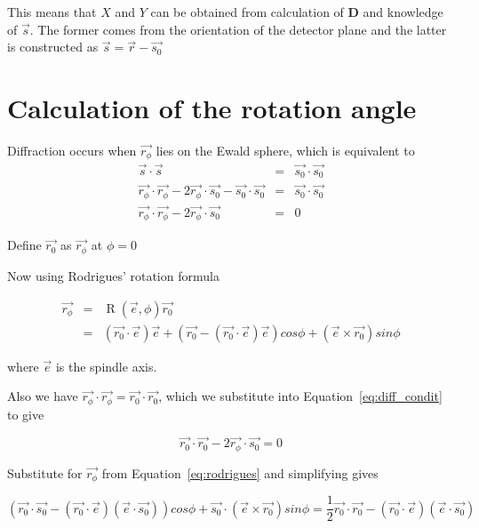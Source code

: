 \documentclass{article}
\begin{document}
This means that $X$ and $Y$ can be obtained from calculation of $\mathbf{D}$ and knowledge of $\vec{s}$. The former
comes from the orientation of the detector plane and the latter is constructed as $\vec{s} = \vec{r} - \vec{s_0}$


\section*{Calculation of the rotation angle}

Diffraction occurs when $\vec{r_\phi}$ lies on the Ewald sphere, which is equivalent to
\begin{eqnarray}
\label{eq:diff_condit}
\vec{s} \cdot \vec{s} & = & \vec{s_0} \cdot \vec{s_0} \nonumber \\
\vec{r_\phi} \cdot \vec{r_\phi} - 2 \vec{r_\phi} \cdot \vec{s_0} - \vec{s_0} \cdot \vec{s_0} & = & \vec{s_0} \cdot \vec{s_0} \nonumber \\
\vec{r_\phi} \cdot \vec{r_\phi} - 2 \vec{r_\phi} \cdot \vec{s_0} & = & 0
\end{eqnarray}

Define $\vec{r_0}$ as $\vec{r_\phi}$ at $\phi = 0$

Now using Rodrigues' rotation formula

\begin{eqnarray}
\label{eq:rodrigues}
\vec{r_\phi} & = & \operatorname{R}(\vec{e}, \phi) \vec{r_0} \nonumber \\
 & = & \left( \vec{r_0} \cdot \vec{e} \right) \vec{e} + 
       \left( \vec{r_0} - \left( \vec{r_0} \cdot \vec{e} \right) \vec{e} \right) cos{\phi} +
       \left( \vec{e} \times \vec{r_0} \right) sin{\phi}
\end{eqnarray}

where $\vec{e}$ is the spindle axis.

Also we have $\vec{r_\phi} \cdot \vec{r_\phi} = \vec{r_0} \cdot \vec{r_0}$, which we substitute into Equation~\ref{eq:diff_condit} to give

\begin{equation}
\vec{r_0} \cdot \vec{r_0} - 2 \vec{r_\phi} \cdot \vec{s_0}  =  0
\end{equation}

Substitute for $\vec{r_\phi}$ from Equation~\ref{eq:rodrigues} and simplifying gives

\begin{equation}
\label{eq:prediction}
\left(
  \vec{r_0} \cdot \vec{s_0} - \left( \vec{r_0} \cdot \vec{e} \right) \left( \vec{e} \cdot \vec{s_0} \right)
\right) cos{\phi} + 
\vec{s_0} \cdot \left( \vec{e} \times \vec{r_0} \right) sin{\phi} = 
\frac{1}{2} \vec{r_0} \cdot \vec{r_0} - \left( \vec{r_0} \cdot \vec{e} \right) \left( \vec{e} \cdot \vec{s_0} \right)
\end{equation}
\end{document}
